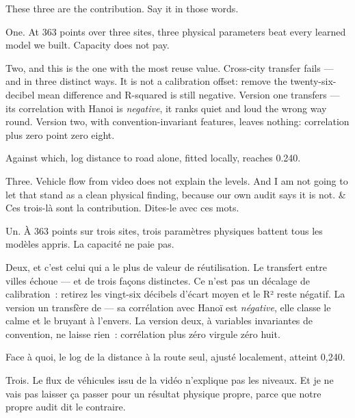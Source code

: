 \documentclass[10pt,a4paper]{article}
\begin{document}
\begin{say}
These three are the contribution. Say it in those words.

One. At 363 points over three sites, three physical parameters beat every learned
model we built. Capacity does not pay.

Two, and this is the one with the most reuse value. Cross-city transfer fails ---
and in three distinct ways. It is not a calibration offset: remove the
twenty-six-decibel mean difference and R-squared is still negative. Version one
transfers  --- its correlation with Hanoi is
\emph{negative}, it ranks quiet and loud the wrong way round. Version two, with
convention-invariant features, leaves nothing: correlation plus zero point zero
eight. 

Against which, log distance to road alone, fitted locally, reaches 0.240.

Three. Vehicle flow from video does not explain the levels. And I am not going to
let that stand as a clean physical finding, because our own audit says it is not.
&
Ces trois-là sont la contribution. Dites-le avec ces mots.

Un. À 363 points sur trois sites, trois paramètres physiques battent tous les
modèles appris. La capacité ne paie pas.

Deux, et c'est celui qui a le plus de valeur de réutilisation. Le transfert entre
villes échoue --- et de trois façons distinctes. Ce n'est pas un décalage de
calibration~: retirez les vingt-six décibels d'écart moyen et le R² reste négatif.
La version un transfère de  --- sa corrélation avec Hanoï
est \emph{négative}, elle classe le calme et le bruyant à l'envers. La version
deux, à variables invariantes de convention, ne laisse rien~: corrélation plus
zéro virgule zéro huit. 

Face à quoi, le log de la distance à la route seul, ajusté localement, atteint
0,240. 

Trois. Le flux de véhicules issu de la vidéo n'explique pas les niveaux. Et je ne
vais pas laisser ça passer pour un résultat physique propre, parce que notre
propre audit dit le contraire.
\end{say}
\end{document}
